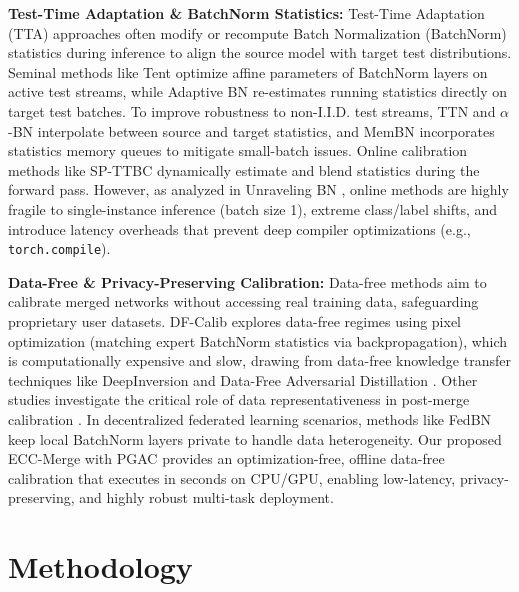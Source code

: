 \documentclass{article}
\theoremstyle{plain}
\theoremstyle{definition}
\theoremstyle{remark}
\begin{document}
\textbf{Test-Time Adaptation \& BatchNorm Statistics:} Test-Time Adaptation (TTA) approaches often modify or recompute Batch Normalization (BatchNorm) \cite{resnet} statistics during inference to align the source model with target test distributions. Seminal methods like Tent \cite{tent} optimize affine parameters of BatchNorm layers on active test streams, while Adaptive BN \cite{da_bn, bn_stats_transfer, robust_bn} re-estimates running statistics directly on target test batches. To improve robustness to non-I.I.D. test streams, TTN \cite{ttn} and $\alpha$-BN \cite{alpha_bn} interpolate between source and target statistics, and MemBN \cite{membn} incorporates statistics memory queues to mitigate small-batch issues. Online calibration methods like SP-TTBC \cite{spttbc} dynamically estimate and blend statistics during the forward pass. However, as analyzed in Unraveling BN \cite{unraveling_bn}, online methods are highly fragile to single-instance inference (batch size 1), extreme class/label shifts, and introduce latency overheads that prevent deep compiler optimizations (e.g., \texttt{torch.compile}).

\textbf{Data-Free \& Privacy-Preserving Calibration:} Data-free methods aim to calibrate merged networks without accessing real training data, safeguarding proprietary user datasets. DF-Calib \cite{dfcalib} explores data-free regimes using pixel optimization (matching expert BatchNorm statistics via backpropagation), which is computationally expensive and slow, drawing from data-free knowledge transfer techniques like DeepInversion \cite{reconstruct_data} and Data-Free Adversarial Distillation \cite{generative_data_free}. Other studies investigate the critical role of data representativeness in post-merge calibration \cite{role_of_data}. In decentralized federated learning scenarios, methods like FedBN \cite{fedbn} keep local BatchNorm layers private to handle data heterogeneity. Our proposed ECC-Merge with PGAC provides an optimization-free, offline data-free calibration that executes in seconds on CPU/GPU, enabling low-latency, privacy-preserving, and highly robust multi-task deployment.

\section{Methodology}
\label{sec:method}
\end{document}
